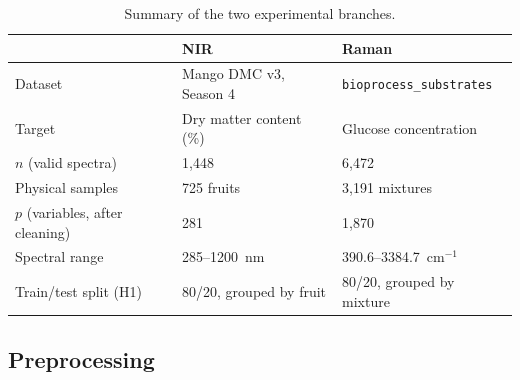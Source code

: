 \documentclass[preprint,12pt]{elsarticle}
\providecommand{\DIFaddbegin}{} %
\providecommand{\DIFaddend}{} %
\providecommand{\DIFdelbegin}{} %
\providecommand{\DIFdelend}{} %
\providecommand{\DIFscaledelfig}{0.5}
\newlength{\DIFdelgraphicswidth} %
\newlength{\DIFdelgraphicsheight} %
\providecommand{\DIFaddincludegraphics}[2][]{{\color{blue}\fbox{\DIFOincludegraphics[#1]{#2}}}} %
\providecommand{\DIFdelincludegraphics}[2][]{%
\sbox{\DIFdelgraphicsbox}{\DIFOincludegraphics[#1]{#2}}%
\settoboxwidth{\DIFdelgraphicswidth}{\DIFdelgraphicsbox} %
\settoboxtotalheight{\DIFdelgraphicsheight}{\DIFdelgraphicsbox} %
\scalebox{\DIFscaledelfig}{%
\parbox[b]{\DIFdelgraphicswidth}{\usebox{\DIFdelgraphicsbox}\\[-\baselineskip] \rule{\DIFdelgraphicswidth}{0em}}\llap{\resizebox{\DIFdelgraphicswidth}{\DIFdelgraphicsheight}{%
\setlength{\unitlength}{\DIFdelgraphicswidth}%
\begin{picture}(1,1)%
\thicklines\linethickness{2pt} %
{\color[rgb]{1,0,0}\put(0,0){\framebox(1,1){}}}%
{\color[rgb]{1,0,0}\put(0,0){\line( 1,1){1}}}%
{\color[rgb]{1,0,0}\put(0,1){\line(1,-1){1}}}%
\end{picture}%
}\hspace*{3pt}}} %
} %
\DeclareRobustCommand{\DIFaddbegin}{\DIFOaddbegin \let\includegraphics\DIFaddincludegraphics} %
\DeclareRobustCommand{\DIFaddend}{\DIFOaddend \let\includegraphics\DIFOincludegraphics} %
\DeclareRobustCommand{\DIFdelbegin}{\DIFOdelbegin \let\includegraphics\DIFdelincludegraphics} %
\DeclareRobustCommand{\DIFdelend}{\DIFOaddend \let\includegraphics\DIFOincludegraphics} %
\begin{document}
\DIFdelbegin %
\DIFdelend \DIFaddbegin \begin{table}[htbp]
\centering
\caption{Summary of the two experimental branches.}
\label{tab:datasets}
\begin{tabular}{lll}
\toprule
& NIR & Raman \\
\midrule
Dataset & Mango DMC v3, Season 4 & \texttt{bioprocess\_substrates} \\
Target & Dry matter content (\%) & Glucose concentration \\
$n$ (valid spectra) & 1,448 & 6,472 \\
Physical samples & 725 fruits & 3,191 mixtures \\
$p$ (variables, after cleaning) & 281 & 1,870 \\
Spectral range & 285--1200~nm & 390.6--3384.7~cm$^{-1}$ \\
Train/test split (H1) & 80/20, grouped by fruit & 80/20, grouped by mixture \\
\bottomrule
\end{tabular}
\end{table}
\DIFaddend 

\subsection{Preprocessing}
\end{document}
